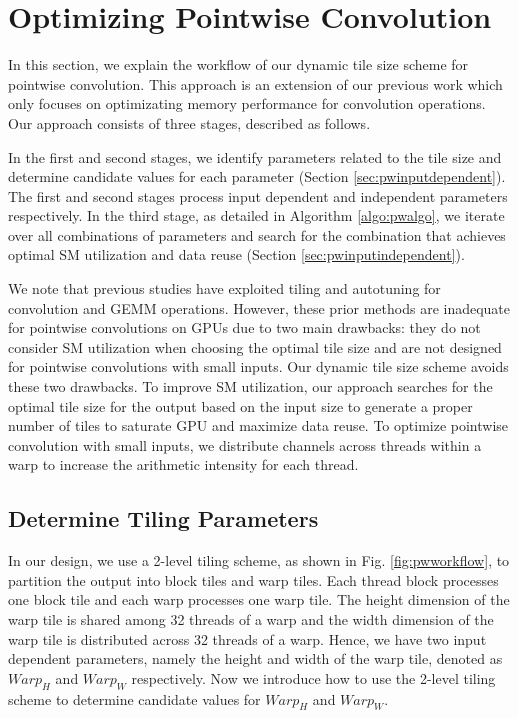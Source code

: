 \section{Optimizing Pointwise Convolution}
\label{sec:pwconv} In this section, we explain the workflow of our dynamic tile size scheme for pointwise convolution. {\color{red}This approach is an extension of our previous work \cite{lu2020optimizing} which only focuses on optimizating memory performance for convolution operations}. Our approach
consists of three stages, described as follows.

In the first and second stages, we identify parameters related to the tile size and determine candidate values for each parameter (Section
\ref{sec:pwinputdependent}). The first and second stages process input dependent and independent parameters respectively. In the third
stage, as detailed in Algorithm \ref{algo:pwalgo}, we iterate over all combinations of parameters and search for the combination that
achieves optimal SM utilization and data reuse (Section \ref{sec:pwinputindependent}).

We note that previous studies \cite{tanner2018tensile, kelefouras2016high, abdelfattah2019fast, kurzak2015implementation,
jiang2020enabling, tillet2017input, lan2019feathercnn,zhang2012autogeneration} have exploited tiling and autotuning for convolution and
GEMM operations. However, these prior methods are inadequate for pointwise convolutions on GPUs due to two main drawbacks: they do not
consider SM utilization when choosing the optimal tile size and are not designed for pointwise convolutions with small inputs. Our dynamic
tile size scheme avoids these two drawbacks. To improve SM utilization, our approach searches for the optimal tile size for the output
based on the input size to generate a proper number of tiles to saturate GPU and maximize data reuse. To optimize pointwise convolution
with small inputs, we distribute channels across threads within a warp to increase the arithmetic intensity for each thread.


\subsection{Determine Tiling Parameters\label{sec:pwinputdependent}}

In our design, we use a 2-level tiling scheme, as shown in Fig. \ref{fig:pwworkflow}, to partition the output into block tiles and warp tiles.
Each thread block processes one block tile and each warp processes one warp tile.
The height dimension of the warp tile is shared among 32 threads of a warp and the width dimension of the warp tile is distributed across 32 threads of a warp.
Hence, we have two input dependent parameters, namely the height and width of the warp tile, denoted as $Warp_H$ and $Warp_W$ respectively.
Now we introduce how to use the 2-level tiling scheme to determine candidate values for $Warp_H$ and $Warp_W$.
